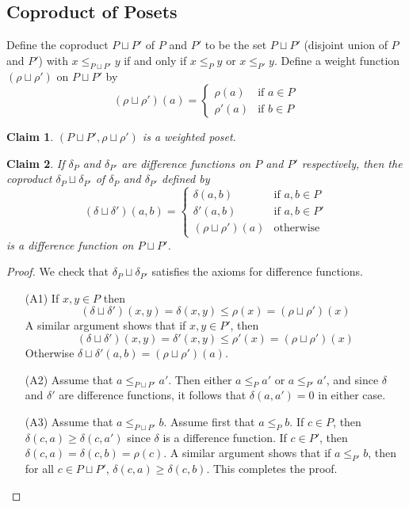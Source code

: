 \documentclass[acmsmall,review,anonymous]{acmart}\settopmatter{printfolios=true,printccs=false,printacmref=false}
\newtheorem{claim}{Claim}
\begin{document}
\subsection{Coproduct of Posets}
Define the coproduct $P \sqcup P'$ of $P$ and $P'$ to be the set $P \sqcup P'$
(disjoint union of $P$ and $P'$) with $x \leq_{P \sqcup P'} y$ if and only if
$x \leq_P y$ or $x \leq_{P'} y$. Define a weight function
$(\rho \sqcup \rho')$ on $P \sqcup P'$ by
$$(\rho \sqcup \rho')(a) =
\begin{cases}
\rho(a) &\text{if }a \in P\\
\rho'(a) &\text{if }b \in P
\end{cases}$$
\begin{claim}
$(P \sqcup P', \rho \sqcup \rho')$ is a weighted poset.
\end{claim}
\begin{claim}
If $\delta_P$ and $\delta_{P'}$ are difference
functions on $P$ and $P'$ respectively, then the coproduct $\delta_P \sqcup
\delta_{P'}$ of $\delta_P$ and $\delta_{P'}$ defined by $$(\delta \sqcup
\delta')(a, b) =
\begin{cases}
\delta(a, b) &\text{if }a, b \in P\\
\delta'(a, b) &\text{if }a, b \in P'\\
(\rho \sqcup \rho')(a) & \text{otherwise}
\end{cases}$$
is a difference function on $P \sqcup P'$.
\end{claim}
\begin{proof}
We check that $\delta_P \sqcup \delta_{P'}$ satisfies the axioms for difference
functions.
\begin{enumerate}
  \item[(A1)]
  If $x, y \in P$ then
  $$
  (\delta \sqcup \delta')(x, y) = \delta(x, y) \leq \rho(x) = (\rho \sqcup
  \rho')(x)
  $$
  A similar argument shows that if $x, y \in P'$, then
  $$
  (\delta \sqcup \delta')(x, y) = \delta'(x, y) \leq \rho'(x) = (\rho \sqcup
  \rho')(x)
  $$
  Otherwise $\delta \sqcup \delta'(a, b) = (\rho \sqcup \rho')(a)$.
  \item[(A2)]
  Assume that $a \leq_{P \sqcup P'} a'$. Then either $a \leq_P a'$ or $a
  \leq_{P'} a'$, and since $\delta$ and $\delta'$ are difference functions, it
  follows that $\delta(a, a') = 0$ in either case.
  \item[(A3)]
  Assume that $a \leq_{P \sqcup P'} b$. Assume first that $a \leq_P b$. If $c
  \in P$, then $\delta(c, a) \geq \delta(c, a')$ since $\delta$ is a difference
  function. If $c \in P'$, then $\delta(c, a) = \delta(c, b) = \rho(c)$. A
  similar argument shows that if $a \leq_{P'} b$, then for all $c \in P \sqcup
  P'$, $\delta(c, a) \geq \delta(c, b)$. This completes the proof.
\end{enumerate}
\end{proof}
\end{document}
